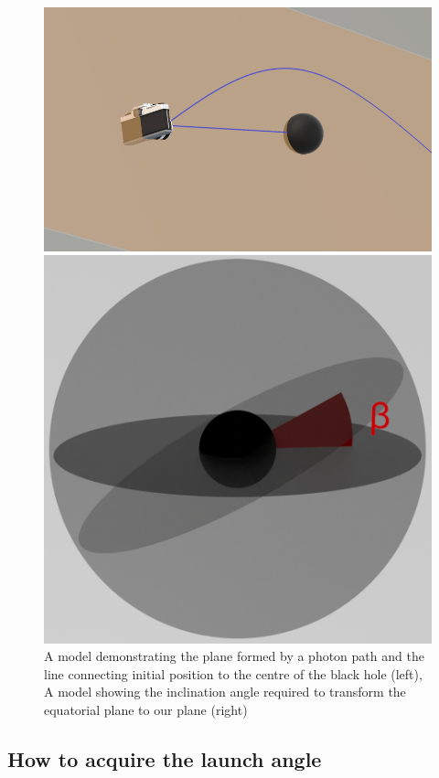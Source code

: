\documentclass[oneside,openright,frontopenright, singlespacing]{dmathesis}
\begin{document}
\begin{figure}[!ht]
	\centering
	\begin{minipage}{0.5\textwidth}
		\centering
		\includegraphics[width=\linewidth]{img/plane}
	\end{minipage}%
	\hfill
	\begin{minipage}{0.5\textwidth}
		\centering
		\includegraphics[width=0.622\linewidth]{img/inclinationfigure}
	\end{minipage}
	\caption{A model demonstrating the plane formed by a photon path and the line connecting initial position to the centre of the black hole (left), A model showing the inclination angle required to transform the equatorial plane to our plane (right)}
	\label{fig:Figure3.2}
\end{figure}

\subsection{How to acquire the launch angle}\label{subsec:Subsection3.5.2}
\end{document}
